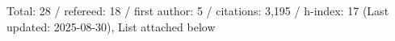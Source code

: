 Total: 28 / refereed: 18 / first author: 5 / citations: 3,195 / h-index: 17 (Last updated: 2025-08-30), List attached below